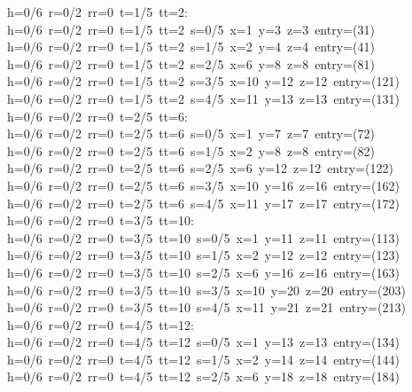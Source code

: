 \begin{tabbing}
h=0/6\ r=0/2\ rr=0\ t=1/5\ tt=2:\\[0pt]
h=0/6\ r=0/2\ rr=0\ t=1/5\ tt=2\ s=0/5\ x=1\ y=3\ z=3\ entry=(31)\\[0pt]
h=0/6\ r=0/2\ rr=0\ t=1/5\ tt=2\ s=1/5\ x=2\ y=4\ z=4\ entry=(41)\\[0pt]
h=0/6\ r=0/2\ rr=0\ t=1/5\ tt=2\ s=2/5\ x=6\ y=8\ z=8\ entry=(81)\\[0pt]
h=0/6\ r=0/2\ rr=0\ t=1/5\ tt=2\ s=3/5\ x=10\ y=12\ z=12\ entry=(121)\\[0pt]
h=0/6\ r=0/2\ rr=0\ t=1/5\ tt=2\ s=4/5\ x=11\ y=13\ z=13\ entry=(131)\\[0pt]
h=0/6\ r=0/2\ rr=0\ t=2/5\ tt=6:\\[0pt]
h=0/6\ r=0/2\ rr=0\ t=2/5\ tt=6\ s=0/5\ x=1\ y=7\ z=7\ entry=(72)\\[0pt]
h=0/6\ r=0/2\ rr=0\ t=2/5\ tt=6\ s=1/5\ x=2\ y=8\ z=8\ entry=(82)\\[0pt]
h=0/6\ r=0/2\ rr=0\ t=2/5\ tt=6\ s=2/5\ x=6\ y=12\ z=12\ entry=(122)\\[0pt]
h=0/6\ r=0/2\ rr=0\ t=2/5\ tt=6\ s=3/5\ x=10\ y=16\ z=16\ entry=(162)\\[0pt]
h=0/6\ r=0/2\ rr=0\ t=2/5\ tt=6\ s=4/5\ x=11\ y=17\ z=17\ entry=(172)\\[0pt]
h=0/6\ r=0/2\ rr=0\ t=3/5\ tt=10:\\[0pt]
h=0/6\ r=0/2\ rr=0\ t=3/5\ tt=10\ s=0/5\ x=1\ y=11\ z=11\ entry=(113)\\[0pt]
h=0/6\ r=0/2\ rr=0\ t=3/5\ tt=10\ s=1/5\ x=2\ y=12\ z=12\ entry=(123)\\[0pt]
h=0/6\ r=0/2\ rr=0\ t=3/5\ tt=10\ s=2/5\ x=6\ y=16\ z=16\ entry=(163)\\[0pt]
h=0/6\ r=0/2\ rr=0\ t=3/5\ tt=10\ s=3/5\ x=10\ y=20\ z=20\ entry=(203)\\[0pt]
h=0/6\ r=0/2\ rr=0\ t=3/5\ tt=10\ s=4/5\ x=11\ y=21\ z=21\ entry=(213)\\[0pt]
h=0/6\ r=0/2\ rr=0\ t=4/5\ tt=12:\\[0pt]
h=0/6\ r=0/2\ rr=0\ t=4/5\ tt=12\ s=0/5\ x=1\ y=13\ z=13\ entry=(134)\\[0pt]
h=0/6\ r=0/2\ rr=0\ t=4/5\ tt=12\ s=1/5\ x=2\ y=14\ z=14\ entry=(144)\\[0pt]
h=0/6\ r=0/2\ rr=0\ t=4/5\ tt=12\ s=2/5\ x=6\ y=18\ z=18\ entry=(184)\\[0pt]

\end{tabbing}
